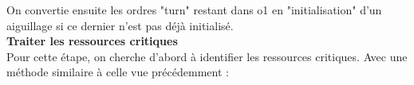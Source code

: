 \documentclass[runningheads]{llncs}
\newcommand{\tuple}[1]{\ensuremath{\langle #1\rangle}}
\begin{document}

On convertie ensuite les ordres "turn" restant dans o1 en "initialisation" d'un aiguillage si ce dernier n'est pas déjà initialisé.
\\\textbf{Traiter les ressources critiques}\\
Pour cette étape, on cherche d'abord à identifier les ressources critiques. Avec une méthode similaire à celle vue précédemment :

\vspace{0.5cm}
\end{document}
